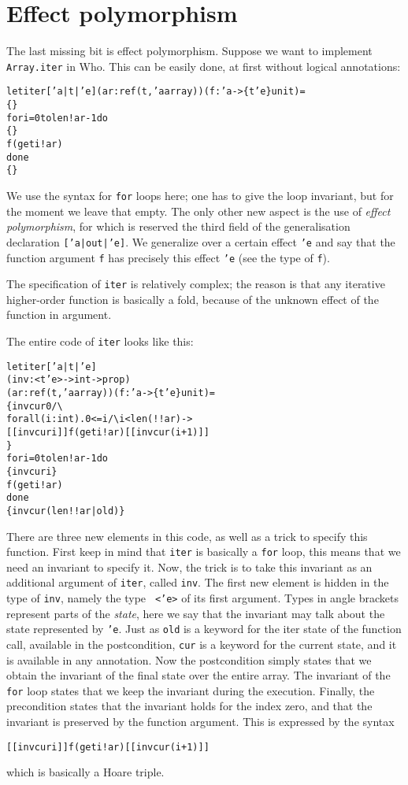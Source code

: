 \documentclass[a4paper]{scrreprt}
\newcommand{\who}{Who\xspace}
\begin{document}
\section{Effect polymorphism}
The last missing bit is effect polymorphism. Suppose we want to implement {\tt
Array.iter} in \who. This can be easily done, at first without logical
annotations:
\begin{alltt}
let iter ['a|t|'e] (ar : ref(t, 'a array)) (f : 'a ->\{t 'e\} unit)  =
  \{  \}
  for i = 0 to len !ar - 1 do
    \{ \}
    f (get i !ar)
  done
  \{ \}
\end{alltt}
We use the syntax for {\tt for} loops here; one has to give the loop
invariant, but for the moment we leave that empty. The only other new aspect
is the use of {\em effect polymorphism}, for which is reserved the third field
of the generalisation declaration {\tt ['a|out|'e]}. We generalize over a
certain effect {\tt 'e} and say that the function argument {\tt f} has
precisely this effect {\tt 'e} (see the type of {\tt f}).

The specification of {\tt iter} is relatively complex; the reason is that any
iterative higher-order function is basically a fold, because of the unknown
effect of the function in argument.

The entire code of {\tt iter} looks like this:
\begin{alltt}
let iter ['a|t|'e]
  (inv : <t 'e> -> int ->  prop)
  (ar : ref(t, 'a array)) (f : 'a ->\{t 'e\} unit)  =
  \{ inv cur 0 \verb|/\|
    forall (i:int). 0 <= i \verb|/\| i < len (!!ar) ->
    [[ inv cur i ]] f (get i !ar) [[inv cur (i+1)]]
  \}
  for i = 0 to len !ar - 1 do
    \{ inv cur i \}
    f (get i !ar)
  done
  \{inv cur (len !!ar|old) \}
\end{alltt}
There are three new elements in this code, as well as a trick to specify this
function. First keep in mind that {\tt iter} is basically a {\tt for} loop,
this means that we need an invariant to specify it. Now, the trick is to take
this invariant as an additional argument of {\tt iter}, called {\tt inv}. The
first new element is hidden in the type of {\tt inv}, namely the type {\tt
<'e>} of its first argument. Types in angle brackets {\tt < >} represent parts
of the {\em state}, here we say that the invariant may talk about the state
represented by {\tt 'e}. Just as {\tt old} is a keyword for the iter state of
the function call, available in the postcondition, {\tt cur} is a keyword for
the current state, and it is available in any annotation.  Now the
postcondition simply states that we obtain the invariant of the final state
over the entire array. The invariant of the {\tt for} loop states that we keep
the invariant during the execution. Finally, the precondition states that the
invariant holds for the index zero, and that the invariant is preserved by the
function argument. This is expressed by the syntax
\begin{alltt}
    [[ inv cur i ]] f (get i !ar) [[inv cur (i+1)]]
\end{alltt}
which is basically a Hoare triple.
\end{document}
